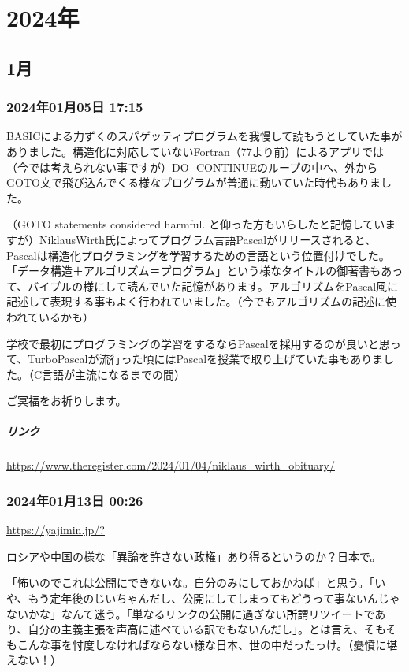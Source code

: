 \chapter{2024年}

\section{1月}

\subsection*{2024年01月05日 17:15}

BASICによる力ずくのスパゲッティプログラムを我慢して読もうとしていた事がありました。構造化に対応していないFortran（77より前）によるアプリでは（今では考えられない事ですが）DO -CONTINUEのループの中へ、外からGOTO文で飛び込んでくる様なプログラムが普通に動いていた時代もありました。

（GOTO statements considered harmful. と仰った方もいらしたと記憶していますが）NiklausWirth氏によってプログラム言語Pascalがリリースされると、Pascalは構造化プログラミングを学習するための言語という位置付けでした。「データ構造＋アルゴリズム＝プログラム」という様なタイトルの御著書もあって、バイブルの様にして読んでいた記憶があります。アルゴリズムをPascal風に記述して表現する事もよく行われていました。（今でもアルゴリズムの記述に使われているかも）

学校で最初にプログラミングの学習をするならPascalを採用するのが良いと思って、TurboPascalが流行った頃にはPascalを授業で取り上げていた事もありました。（C言語が主流になるまでの間）

ご冥福をお祈りします。

\paragraph{リンク}
\url{https://www.theregister.com/2024/01/04/niklaus_wirth_obituary/}

\subsection*{2024年01月13日 00:26}

\url{https://yajimin.jp/?}

ロシアや中国の様な「異論を許さない政権」あり得るというのか？日本で。

「怖いのでこれは公開にできないな。自分のみにしておかねば」と思う。「いや、もう定年後のじいちゃんだし、公開にしてしまってもどうって事ないんじゃないかな」なんて迷う。「単なるリンクの公開に過ぎない所謂リツイートであり、自分の主義主張を声高に述べている訳でもないんだし」。とは言え、そもそもこんな事を忖度しなければならない様な日本、世の中だったっけ。（憂憤に堪えない！）

